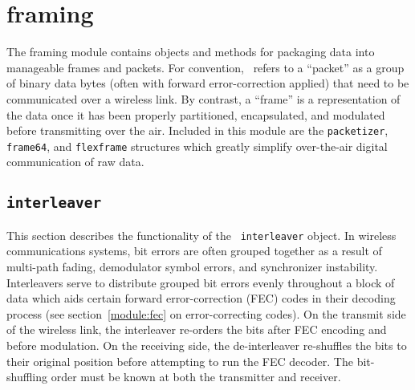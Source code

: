 % 
%

\newpage
\section{framing}
\label{module:framing}
The framing module contains objects and methods for packaging data into
manageable frames and packets.
For convention, \liquid\ refers to a ``packet'' as a group of binary
data bytes (often with forward error-correction applied)
that need to be communicated over a wireless link.
By contrast, a ``frame'' is a representation of the data once it has been
properly partitioned, encapsulated, and modulated before transmitting over the
air.
Included in this module are the {\tt packetizer}, 
{\tt frame64}, and {\tt flexframe} structures which
greatly simplify over-the-air digital communication of raw data.


% 
%
\subsection{{\tt interleaver}}
\label{module:framing:interleaver}
This section describes the functionality of the \liquid\ {\tt interleaver}
object.
In wireless communications systems, bit errors are often grouped together as a
result of multi-path fading, demodulator symbol errors, and synchronizer
instability.
Interleavers serve to distribute grouped bit errors evenly throughout a block
of data which aids certain forward error-correction (FEC) codes in their
decoding process (see section~\ref{module:fec} on error-correcting codes).
On the transmit side of the wireless link, the interleaver re-orders the bits
after FEC encoding and before modulation.
On the receiving side, the de-interleaver re-shuffles the bits to their
original position before attempting to run the FEC decoder.
The bit-shuffling order must be known at both the transmitter and receiver.


